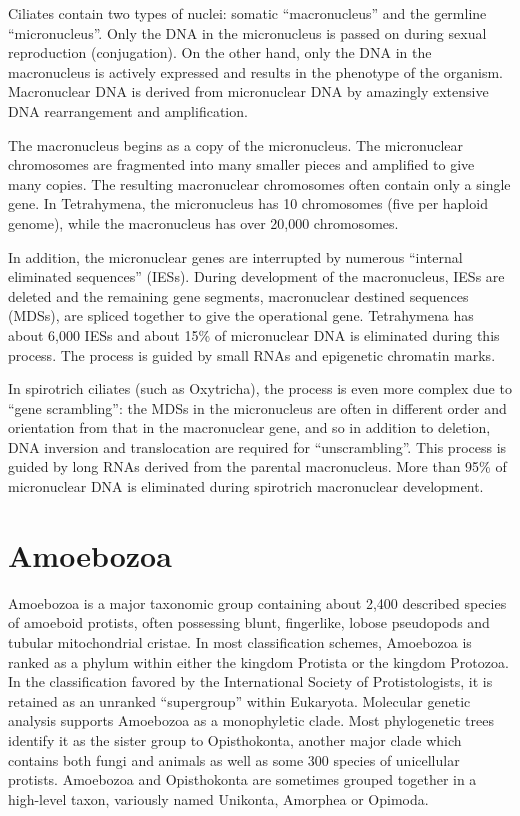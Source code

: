 Ciliates contain two types of nuclei: somatic ``macronucleus'' and the germline ``micronucleus''. Only the DNA in the micronucleus is passed on during sexual reproduction (conjugation). On the other hand, only the DNA in the macronucleus is actively expressed and results in the phenotype of the organism. Macronuclear DNA is derived from micronuclear DNA by amazingly extensive DNA rearrangement and amplification.

The macronucleus begins as a copy of the micronucleus. The micronuclear chromosomes are fragmented into many smaller pieces and amplified to give many copies. The resulting macronuclear chromosomes often contain only a single gene. In Tetrahymena, the micronucleus has 10 chromosomes (five per haploid genome), while the macronucleus has over 20,000 chromosomes.

In addition, the micronuclear genes are interrupted by numerous ``internal eliminated sequences'' (IESs). During development of the macronucleus, IESs are deleted and the remaining gene segments, macronuclear destined sequences (MDSs), are spliced together to give the operational gene. Tetrahymena has about 6,000 IESs and about 15\% of micronuclear DNA is eliminated during this process. The process is guided by small RNAs and epigenetic chromatin marks.

In spirotrich ciliates (such as Oxytricha), the process is even more complex due to ``gene scrambling'': the MDSs in the micronucleus are often in different order and orientation from that in the macronuclear gene, and so in addition to deletion, DNA inversion and translocation are required for ``unscrambling''. This process is guided by long RNAs derived from the parental macronucleus. More than 95\% of micronuclear DNA is eliminated during spirotrich macronuclear development.

\hypertarget{amoebozoa}{%
\section{Amoebozoa}\label{amoebozoa}}

Amoebozoa is a major taxonomic group containing about 2,400 described species of amoeboid protists, often possessing blunt, fingerlike, lobose pseudopods and tubular mitochondrial cristae. In most classification schemes, Amoebozoa is ranked as a phylum within either the kingdom Protista or the kingdom Protozoa. In the classification favored by the International Society of Protistologists, it is retained as an unranked ``supergroup'' within Eukaryota. Molecular genetic analysis supports Amoebozoa as a monophyletic clade. Most phylogenetic trees identify it as the sister group to Opisthokonta, another major clade which contains both fungi and animals as well as some 300 species of unicellular protists. Amoebozoa and Opisthokonta are sometimes grouped together in a high-level taxon, variously named Unikonta, Amorphea or Opimoda.

